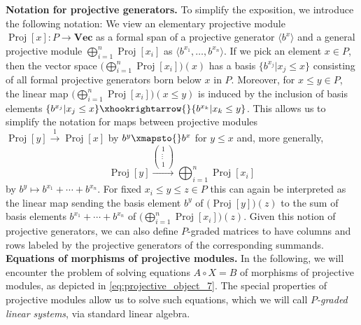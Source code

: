 \documentclass[english,a4paper,nolineno,cleveref]{socg-lipics-v2021}
\DeclareMathOperator{\proj}{Proj}
\begin{document}
\textbf{Notation for projective generators.} To simplify the exposition, we introduce the following notation: We view an elementary projective module $\proj[x]\colon P\rightarrow\mathbf{Vec}$ as a formal span of a projective generator $\langle b^{x}\rangle$ and a general projective module $\bigoplus_{i=1}^n\proj[x_i]$ as $\langle b^{x_1},\ldots, b^{x_n}\rangle$. If we pick an element $x\in P$, then the vector space $\big(\bigoplus_{i=1}^n\proj[x_i]\big)(x)$ has a basis $\{b^{x_j}\vert x_j\leq x\}$ consisting of all formal projective generators born below $x$ in $P$. Moreover, for $x\leq y\in P$, the linear map $\big(\bigoplus_{i=1}^n\proj[x_i]\big)(x\leq y)$ is induced by the inclusion of basis elements  $\{b^{x_j}\vert x_j\leq x\}\xhookrightarrow{} \{b^{x_k}\vert x_k\leq y\}$. This allows us to simplify the notation for maps between projective modules $\proj[y]\xrightarrow{1} \proj[x]$ by $b^{y}\xmapsto{} b^{x}$ for $y\leq x$ and, more generally, 
\begin{equation*}
\proj[y]\xrightarrow{\begin{pmatrix} 1 \\ \vdots \\ 1\end{pmatrix}} \bigoplus_{i=1}^n\proj[x_i]
\end{equation*}
by $b^y\mapsto b^{x_1}+\cdots + b^{x_n}$. For fixed $x_i\leq y\leq z\in P$ this can again be interpreted as the linear map sending the basis element $b^y$ of $\big(\proj[y]\big)(z)$ to the sum of basis elements $b^{x_1}+\cdots + b^{x_n}$ of $\big(\bigoplus_{i=1}^n\proj[x_i]\big)(z)$. Given this notion of projective generators, we can also define $P$-graded matrices to have columns and rows labeled by the projective generators of the corresponding summands. \\


\textbf{Equations of morphisms of projective modules.} In the following, we will encounter the problem of solving equations $A\circ X=B$ of morphisms of projective modules, as depicted in \eqref{eq:projective_object_7}. The special properties of projective modules allow us to solve such equations, which we will call \emph{$P$-graded linear systems}, via standard linear algebra.
\end{document}
